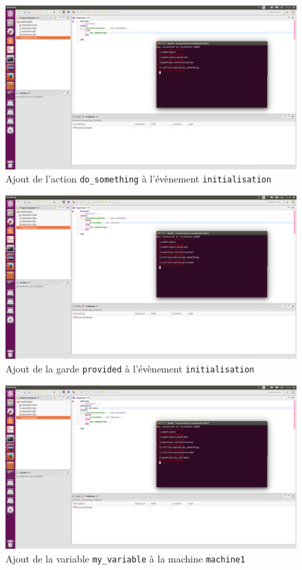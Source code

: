 \begin{figure}[H]
    \centering
    \includegraphics{pictures/rodinCommunication5.png}
    \caption{Ajout de l'action \texttt{do\_something} à l'évènement \texttt{initialisation}}
    \label{fig:rodinCommunication5}
\end{figure}

\begin{figure}[H]
    \centering
    \includegraphics{pictures/rodinCommunication6.png}
    \caption{Ajout de la garde \texttt{provided} à l'évènement \texttt{initialisation}}
    \label{fig:rodinCommunication6}
\end{figure}

\begin{figure}[H]
    \centering
    \includegraphics{pictures/rodinCommunication7.png}
    \caption{Ajout de la variable \texttt{my\_variable} à la machine \texttt{machine1}}
    \label{fig:rodinCommunication7}
\end{figure}
